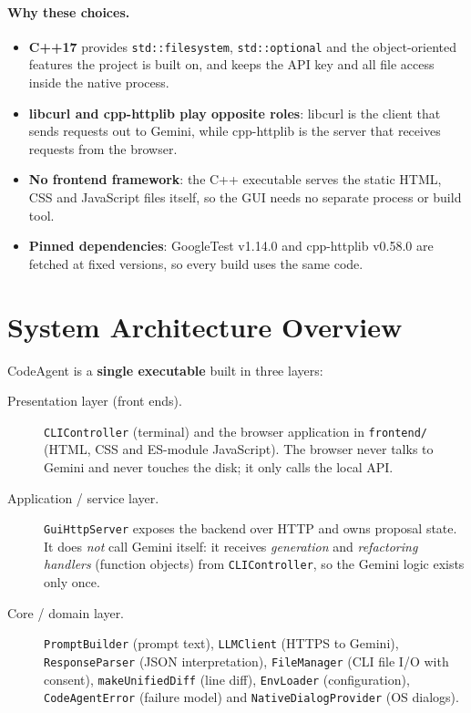 \documentclass[12pt,a4paper,oneside]{book}
\begin{document}
\paragraph{Why these choices.}
\begin{itemize}
  \item \textbf{C++17} provides \texttt{std::filesystem}, \texttt{std::optional}
    and the object-oriented features the project is built on, and keeps the
    API key and all file access inside the native process.
  \item \textbf{libcurl and cpp-httplib play opposite roles}: libcurl is the
    client that sends requests out to Gemini, while cpp-httplib is the server
    that receives requests from the browser.
  \item \textbf{No frontend framework}: the C++ executable serves the static
    HTML, CSS and JavaScript files itself, so the GUI needs no separate
    process or build tool.
  \item \textbf{Pinned dependencies}: GoogleTest v1.14.0 and cpp-httplib
    v0.58.0 are fetched at fixed versions, so every build uses the same code.
\end{itemize}

\section{System Architecture Overview}

CodeAgent is a \textbf{single executable} built in three layers:

\begin{description}
  \item[Presentation layer (front ends).]
    \texttt{CLIController} (terminal) and the browser application in
    \texttt{frontend/\allowbreak{}} (HTML, CSS and ES-module JavaScript). The browser never
    talks to Gemini and never touches the disk; it only calls the local API.
  \item[Application / service layer.]
    \texttt{GuiHttpServer} exposes the backend over HTTP and owns proposal
    state. It does \emph{not} call Gemini itself: it receives
    \emph{generation} and \emph{refactoring handlers} (function objects) from
    \texttt{CLIController}, so the Gemini logic exists only once.
  \item[Core / domain layer.]
    \texttt{PromptBuilder} (prompt text), \texttt{LLMClient} (HTTPS to
    Gemini), \texttt{ResponseParser} (JSON interpretation),
    \texttt{FileManager} (CLI file I/O with consent), \texttt{makeUnifiedDiff}
    (line diff), \texttt{EnvLoader} (configuration), \texttt{CodeAgentError}
    (failure model) and \texttt{NativeDialog\allowbreak{}Provider} (OS dialogs).
\end{description}
\end{document}
